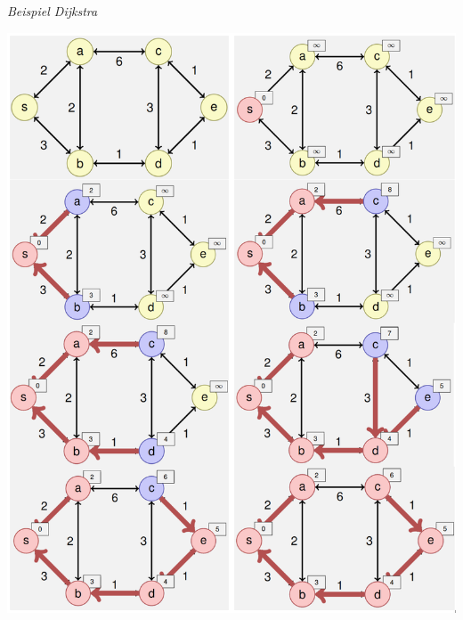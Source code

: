 \begin{sectionbox}
\textit{Beispiel Dijkstra}\par
\includegraphics[width = \columnwidth]{../img/DijkstraBsp.png}\par
\end{sectionbox}

\vspace{300px}

